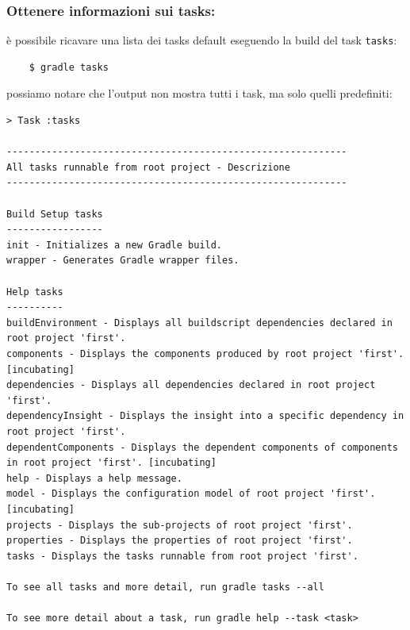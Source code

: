\documentclass{article}
\begin{document}
\begin{flushleft}
\subsubsection{Ottenere informazioni sui tasks:} è possibile ricavare una lista dei tasks default eseguendo la build del task \texttt{tasks}:
    \begin{verbatim}
    $ gradle tasks
    \end{verbatim}
    possiamo notare che l'output non mostra tutti i task, ma solo quelli predefiniti:
    \begin{verbatim}
> Task :tasks 

------------------------------------------------------------
All tasks runnable from root project - Descrizione
------------------------------------------------------------

Build Setup tasks
-----------------
init - Initializes a new Gradle build.
wrapper - Generates Gradle wrapper files.

Help tasks
----------
buildEnvironment - Displays all buildscript dependencies declared in root project 'first'.
components - Displays the components produced by root project 'first'. [incubating]
dependencies - Displays all dependencies declared in root project 'first'.
dependencyInsight - Displays the insight into a specific dependency in root project 'first'.
dependentComponents - Displays the dependent components of components in root project 'first'. [incubating]
help - Displays a help message.
model - Displays the configuration model of root project 'first'. [incubating]
projects - Displays the sub-projects of root project 'first'.
properties - Displays the properties of root project 'first'.
tasks - Displays the tasks runnable from root project 'first'.

To see all tasks and more detail, run gradle tasks --all

To see more detail about a task, run gradle help --task <task>



\end{verbatim}
\end{flushleft}
\end{document}
